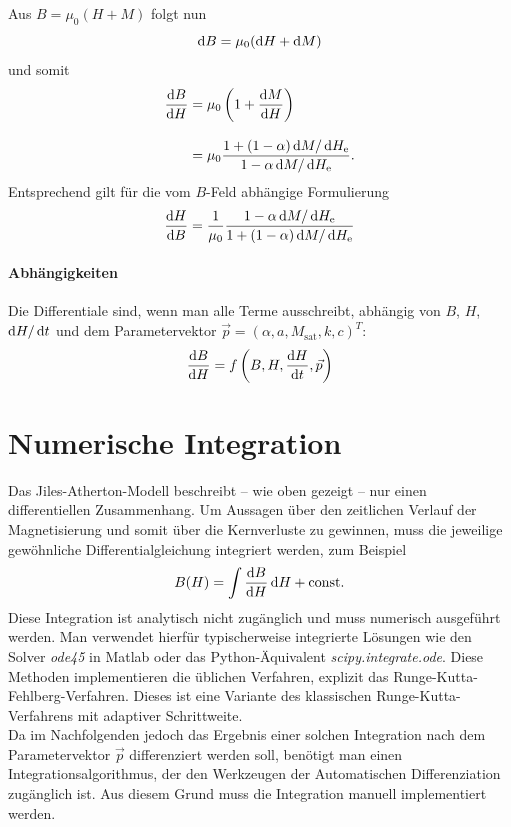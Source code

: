 \documentclass{scrartcl}
\newcommand{\He}{H_\text{e}}
\newcommand{\Msat}{M_\text{sat}}
\begin{document}
Aus $B = \mu_0(H + M)$ folgt nun
\begin{equation}
	\mathop{}\!\mathrm{d} B = \mu_0 (\mathop{}\!\mathrm{d} H + \mathop{}\!\mathrm{d} M)
\end{equation}
und somit
\begin{equation}
\begin{aligned}
	\frac{\dif B}{\dif H} &= \mu_0 \left(1 + \frac{\dif M}{\dif H}\right)\\[0.3cm]
	&= \mu_0 \frac{1 + (1-\alpha)\dif M/\dif \He}{1 - \alpha \dif M/\dif \He}. \label{eq:dB_dH}
\end{aligned}
\end{equation}\vspace{0.3cm}
Entsprechend gilt für die vom $B$-Feld abhängige Formulierung
\begin{equation}
	\frac{\dif H}{\dif B} = \frac{1}{\mu_0} \frac{1 - \alpha \dif M/\dif \He}{1 + (1-\alpha)\dif M/\dif \He}
\end{equation}
\paragraph{Abhängigkeiten}
Die Differentiale sind, wenn man alle Terme ausschreibt, abhängig von $B$, $H$, $\mathop{}\!\mathrm{d} H/\mathop{}\!\mathrm{d} t$ und dem Parametervektor $\vec{p} = (\alpha, a, \Msat, k, c)^T$:
\begin{equation}
	\frac{\mathop{}\!\mathrm{d} B}{\mathop{}\!\mathrm{d} H} = f\left(B, H, \frac{\mathop{}\!\mathrm{d} H}{\mathop{}\!\mathrm{d} t}, \vec p \right)
\end{equation}
\section{Numerische Integration}
\label{sec:numeric-integration}
Das Jiles-Atherton-Modell beschreibt -- wie oben gezeigt -- nur einen differentiellen Zusammenhang. Um Aussagen über den zeitlichen Verlauf der Magnetisierung und somit über die Kernverluste zu gewinnen, muss die jeweilige gewöhnliche Differentialgleichung integriert werden, zum Beispiel
\begin{equation}
B(H) = \int \frac{\mathop{}\!\mathrm{d} B}{\mathop{}\!\mathrm{d} H}\mathop{}\!\mathrm{d} H + \text{const.}
\end{equation}
Diese Integration ist analytisch nicht zugänglich und muss numerisch ausgeführt werden. Man verwendet hierfür typischerweise integrierte Lösungen wie den Solver \emph{ode45} in Matlab oder das Python-Äquivalent \emph{scipy.integrate.ode}. Diese Methoden implementieren die üblichen Verfahren, explizit das Runge-Kutta-Fehlberg-Verfahren. Dieses ist eine Variante des klassischen Runge-Kutta-Verfahrens mit adaptiver Schrittweite.\\
Da im Nachfolgenden jedoch das Ergebnis einer solchen Integration nach dem Parametervektor $\vec p$ differenziert werden soll, benötigt man einen Integrationsalgorithmus, der den Werkzeugen der Automatischen Differenziation zugänglich ist. Aus diesem Grund muss die Integration manuell implementiert werden.
\end{document}
